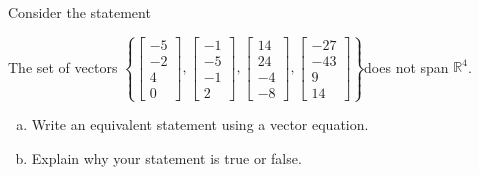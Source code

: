
\begin{exerciseStatement}


Consider the statement 
\begin{center}\begin{minipage}{0.8\textwidth}
 The set of vectors \( \left\{ \left[\begin{array}{c}
-5 \\
-2 \\
4 \\
0
\end{array}\right] , \left[\begin{array}{c}
-1 \\
-5 \\
-1 \\
2
\end{array}\right] , \left[\begin{array}{c}
14 \\
24 \\
-4 \\
-8
\end{array}\right] , \left[\begin{array}{c}
-27 \\
-43 \\
9 \\
14
\end{array}\right] \right\} \)does not span \(\mathbb{R}^4\). 
\end{minipage}\end{center}
    


\begin{enumerate}[(a)]
\item  Write an equivalent statement using a vector equation.
\item  Explain why your statement is true or false.
\end{enumerate}
    
\end{exerciseStatement}
    
